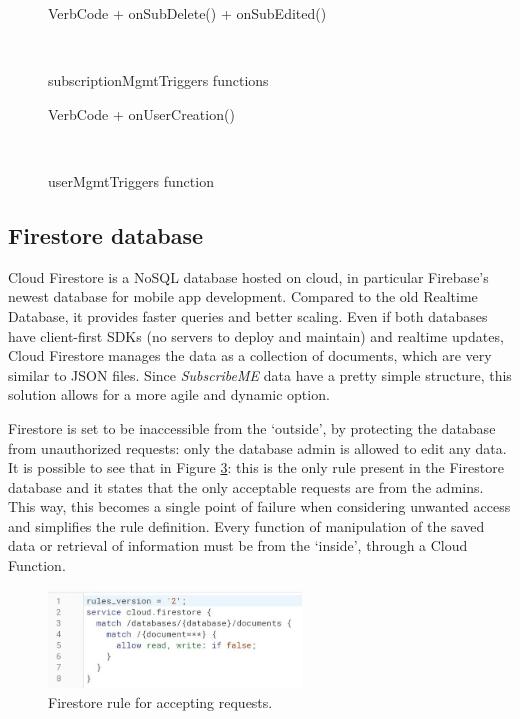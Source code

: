 \documentclass[11pt]{article}
\begin{document}
\begin{figure}[h!]
    \centering
    \begin{SaveVerbatim}{VerbCode}
        + onSubDelete()
        + onSubEdited()
    \end{SaveVerbatim}
    \setlength{\fboxsep}{5mm}
    \caption{subscriptionMgmtTriggers functions}~\label{fig:subtrigger}
\end{figure}

\begin{figure}[h!]
    \centering
    \begin{SaveVerbatim}{VerbCode}
        + onUserCreation()
    \end{SaveVerbatim}
    \setlength{\fboxsep}{5mm}
    \caption{userMgmtTriggers function}~\label{fig:usertrigger}
\end{figure}


\subsection{Firestore database}
Cloud Firestore is a NoSQL database hosted on cloud, in particular Firebase's newest database for mobile app development. Compared to the old Realtime Database, it provides faster queries and better scaling. Even if both databases have client-first SDKs (no servers to deploy and maintain) and realtime updates, Cloud Firestore manages the data as a collection of documents, which are very similar to JSON files. Since \textit{SubscribeME} data have a pretty simple structure, this solution allows for a more agile and dynamic option.

Firestore is set to be inaccessible from the `outside', by protecting the database from unauthorized requests: only the database admin is allowed to edit any data. It is possible to see that in Figure \ref{fig:rule}: this is the only rule present in the Firestore database and it states that the only acceptable requests are from the admins. This way, this becomes a single point of failure when considering unwanted access and simplifies the rule definition. Every function of manipulation of the saved data or retrieval of information must be from the `inside', through a Cloud Function.

\begin{figure}[h!]
    \begin{center}
        \includegraphics[width=0.6\textwidth, clip]{../../assets/firestoreRule.jpg}
    \end{center}
    \caption{Firestore rule for accepting requests.}
    \label{fig:rule}
\end{figure}
\end{document}
